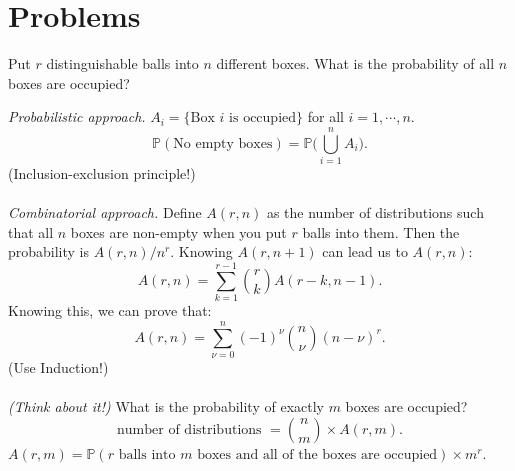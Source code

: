 \section{Problems}
\begin{exercise}
    Put $r$ distinguishable balls into $n$ different boxes. What is the probability of all $n$ boxes are occupied?
\end{exercise}
\textit{Probabilistic approach.} $A_i=\{\text{Box $i$ is occupied}\}$ for all $i=1,\cdots, n$.
\begin{equation}
\mathbb{P}(\text{No empty boxes}) = \mathbb{P}\Big(\bigcup_{i=1}^n A_i\Big).
\end{equation}
(Inclusion-exclusion principle!)\\ \\
\textit{Combinatorial approach.} Define $A(r,n)$ as the number of distributions such that all $n$ boxes are non-empty when you put $r$ balls into them. Then the probability is $A(r,n)/n^r$. Knowing $A(r,n+1)$ can lead us to $A(r,n)$:
\begin{equation}
A(r,n) = \sum_{k=1}^{r-1}\binom{r}{k}A(r-k,n-1).
\end{equation}
Knowing this, we can prove that:
\begin{equation}
A(r,n) = \sum_{\nu = 0}^n(-1)^\nu\binom{n}{\nu}(n-\nu)^r.
\end{equation}
(Use Induction!)\\ \\
\textit{(Think about it!)} What is the probability of exactly $m$ boxes are occupied?
\begin{equation}
\text{number of distributions }= \binom{n}{m}\times A(r,m).
\end{equation}
$A(r,m) = \mathbb{P}(\text{$r$ balls into $m$ boxes and all of the boxes are occupied})\times m^r$.
\newpage

